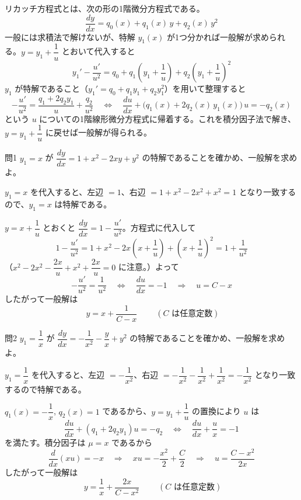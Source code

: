 \documentclass[a4paper,11pt]{article}
\begin{document}


\noindent
リカッチ方程式とは、次の形の1階微分方程式である。
\[
\frac{dy}{dx} = q_{0}(x) + q_{1}(x)\,y + q_{2}(x)\,y^{2}
\]
一般には求積法で解けないが、特解 $y_{1}(x)$ が1つ分かれば一般解が求められる。$y = y_{1} + \dfrac{1}{u}$ とおいて代入すると
\[
y_{1}' - \frac{u'}{u^{2}} = q_{0} + q_{1}\left(y_{1} + \frac{1}{u}\right) + q_{2}\left(y_{1} + \frac{1}{u}\right)^{2}
\]
$y_{1}$ が特解であること（$y_{1}' = q_{0} + q_{1}y_{1} + q_{2}y_{1}^{2}$）を用いて整理すると
\[
-\frac{u'}{u^{2}} = \frac{q_{1} + 2q_{2}y_{1}}{u} + \frac{q_{2}}{u^{2}}
\quad\Longleftrightarrow\quad
\frac{du}{dx} + \bigl(q_{1}(x) + 2q_{2}(x)\,y_{1}(x)\bigr)\,u = -q_{2}(x)
\]
という $u$ についての1階線形微分方程式に帰着する。これを積分因子法で解き、$y = y_{1} + \dfrac{1}{u}$ に戻せば一般解が得られる。

\clearpage
\begin{mondaiboxS}{問1}
$y_{1} = x$ が $\dfrac{dy}{dx} = 1 + x^{2} - 2xy + y^{2}$ の特解であることを確かめ、一般解を求めよ。
\end{mondaiboxS}
\kaitou
$y_{1} = x$ を代入すると、左辺 $= 1$、右辺 $= 1 + x^{2} - 2x^{2} + x^{2} = 1$ となり一致するので、$y_{1} = x$ は特解である。

$y = x + \dfrac{1}{u}$ とおくと $\dfrac{dy}{dx} = 1 - \dfrac{u'}{u^{2}}$。方程式に代入して
\[
1 - \frac{u'}{u^{2}} = 1 + x^{2} - 2x\left(x + \frac{1}{u}\right) + \left(x + \frac{1}{u}\right)^{2}
= 1 + \frac{1}{u^{2}}
\]
（$x^{2} - 2x^{2} - \dfrac{2x}{u} + x^{2} + \dfrac{2x}{u} = 0$ に注意。）よって
\[
-\frac{u'}{u^{2}} = \frac{1}{u^{2}}
\quad\Longleftrightarrow\quad
\frac{du}{dx} = -1
\quad\Longrightarrow\quad
u = C - x
\]
したがって一般解は
\[
\boxed{\; y = x + \frac{1}{C - x} \;}
\qquad (C \text{ は任意定数})
\]

\clearpage
\begin{mondaiboxS}{問2}
$y_{1} = \dfrac{1}{x}$ が $\dfrac{dy}{dx} = -\dfrac{1}{x^{2}} - \dfrac{y}{x} + y^{2}$ の特解であることを確かめ、一般解を求めよ。
\end{mondaiboxS}
\kaitou
$y_{1} = \dfrac{1}{x}$ を代入すると、左辺 $= -\dfrac{1}{x^{2}}$、右辺 $= -\dfrac{1}{x^{2}} - \dfrac{1}{x^{2}} + \dfrac{1}{x^{2}} = -\dfrac{1}{x^{2}}$ となり一致するので特解である。

$q_{1}(x) = -\dfrac{1}{x}$, $q_{2}(x) = 1$ であるから、$y = y_{1} + \dfrac{1}{u}$ の置換により $u$ は
\[
\frac{du}{dx} + \left(q_{1} + 2q_{2}y_{1}\right)u = -q_{2}
\quad\Longleftrightarrow\quad
\frac{du}{dx} + \frac{u}{x} = -1
\]
を満たす。積分因子は $\mu = x$ であるから
\[
\frac{d}{dx}(xu) = -x
\quad\Longrightarrow\quad
xu = -\frac{x^{2}}{2} + \frac{C}{2}
\quad\Longrightarrow\quad
u = \frac{C - x^{2}}{2x}
\]
したがって一般解は
\[
\boxed{\; y = \frac{1}{x} + \frac{2x}{C - x^{2}} \;}
\qquad (C \text{ は任意定数})
\]
\end{document}

